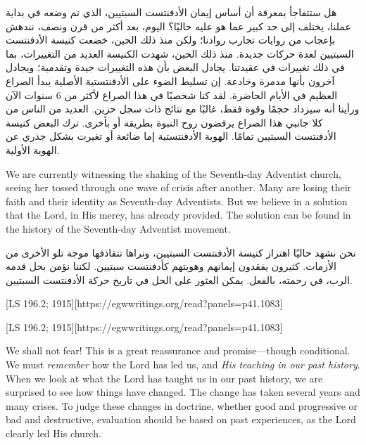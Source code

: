 هل ستتفاجأ بمعرفة أن أساس إيمان الأدفنتست السبتيين، الذي تم وضعه في بداية عملنا، يختلف إلى حد كبير عما هو عليه حاليًا؟ اليوم، بعد أكثر من قرن ونصف، نندهش بإعجاب من روايات تجارب روادنا؛ ولكن منذ ذلك الحين، خضعت كنيسة الأدفنتست السبتيين لعدة حركات جديدة. منذ ذلك الحين، شهدت الكنيسة العديد من التغييرات، بما في ذلك تغييرات في عقيدتنا. يجادل البعض بأن هذه التغييرات جيدة وتقدمية؛ ويجادل آخرون بأنها مدمرة وخادعة. إن تسليط الضوء على الأدفنتستية الأصلية يبدأ الصراع العظيم في الأيام الحاضرة. لقد كنا شخصيًا في هذا الصراع لأكثر من 6 سنوات الآن ورأينا أنه سيزداد حجمًا وقوة فقط، غالبًا مع نتائج ذات سجل حزين. العديد من الناس من كلا جانبي هذا الصراع يرفضون روح النبوة بطريقة أو بأخرى. ترك البعض كنيسة الأدفنتست السبتيين تمامًا. الهوية الأدفنتستية إما ضائعة أو تغيرت بشكل جذري عن الهوية الأولية.


We are currently witnessing the shaking of the Seventh-day Adventist church, seeing her tossed through one wave of crisis after another. Many are losing their faith and their identity as Seventh-day Adventists. But we believe in a solution that the Lord, in His mercy, has already provided. The solution can be found in the history of the Seventh-day Adventist movement.


نحن نشهد حاليًا اهتزاز كنيسة الأدفنتست السبتيين، ونراها تتقاذفها موجة تلو الأخرى من الأزمات. كثيرون يفقدون إيمانهم وهويتهم كأدفنتست سبتيين. لكننا نؤمن بحل قدمه الرب، في رحمته، بالفعل. يمكن العثور على الحل في تاريخ حركة الأدفنتست السبتيين.


[LS 196.2; 1915][https://egwwritings.org/read?panels=p41.1083]


[LS 196.2; 1915][https://egwwritings.org/read?panels=p41.1083]


We shall not fear! This is a great reassurance and promise—though conditional. We must \textit{remember} how the Lord has led us, and \textit{His teaching in our past history}. When we look at what the Lord has taught us in our past history, we are surprised to see how things have changed. The change has taken several years and many crises. To judge these changes in doctrine, whether good and progressive or bad and destructive, evaluation should be based on past experiences, as the Lord clearly led His church.


